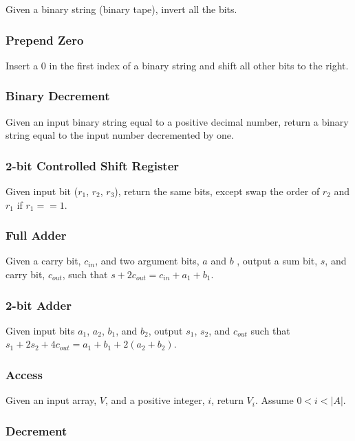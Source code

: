 Given a binary string (binary tape), invert all the bits.

\subsubsection{Prepend Zero}

Insert a $0$ in the first index of a binary string and shift all other bits to the right.

\subsubsection{Binary Decrement}

Given an input binary string equal to a positive decimal number, return a binary string equal to the input number decremented by one.

\subsubsection{2-bit Controlled Shift Register}

Given input bit ($r_1$, $r_2$, $r_3$), return the same bits, except swap the order of $r_2$ and $r_1$ if $r_1 == 1$.

\subsubsection{Full Adder}

Given a carry bit, $c_{in}$, and two argument bits, $a$ and $b$ , output a sum bit, $s$, and carry bit, $c_{out}$, such that  $s + 2c_{out} = c_{in} + a_1 + b_1$.

\subsubsection{2-bit Adder}

Given input bits $a_1$, $a_2$, $b_1$, and $b_2$, output $s_1$, $s_2$, and $c_{out}$ such that  $s_1 + 2s_2 + 4c_{out} = a_1 + b_1 + 2(a_2 + b_2)$.

\subsubsection{Access}

Given an input array, $V$, and a positive integer, $i$, return $V_i$. Assume $0 < i < |A|$.

\subsubsection{Decrement}

